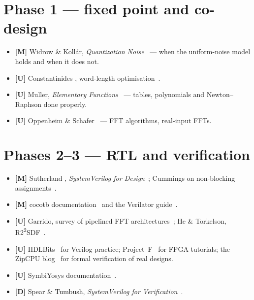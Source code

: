 \section*{Phase 1 --- fixed point and co-design}
\begin{itemize}
  \item \textbf{[M]} Widrow \& Koll\'ar, \emph{Quantization
        Noise}~\cite{widrow2008quantization} --- when the uniform-noise model
        holds and when it does not.
  \item \textbf{[U]} Constantinides \etal, word-length
        optimisation~\cite{ch12-13:constantinides2003wordlength}.
  \item \textbf{[U]} Muller, \emph{Elementary Functions}~\cite{muller2016elementary}
        --- tables, polynomials and Newton--Raphson done properly.
  \item \textbf{[U]} Oppenheim \& Schafer~\cite{oppenheim2010dtsp} --- FFT
        algorithms, real-input FFTs.
\end{itemize}

\section*{Phases 2--3 --- RTL and verification}
\begin{itemize}
  \item \textbf{[M]} Sutherland \etal, \emph{SystemVerilog for
        Design}~\cite{sutherland2006svdesign}; Cummings on non-blocking
        assignments~\cite{cummings2000nonblocking}.
  \item \textbf{[M]} cocotb documentation~\cite{ch12-13:cocotbdocs} and the
        Verilator guide~\cite{ch12-13:verilatorguide}.
  \item \textbf{[U]} Garrido, survey of pipelined FFT
        architectures~\cite{ch12-13:garrido2022fft}; He \& Torkelson,
        R2\textsuperscript{2}SDF~\cite{he1996r22sdf}.
  \item \textbf{[U]} HDLBits~\cite{ch12-13:hdlbits} for Verilog practice;
        Project~F~\cite{ch12-13:projectf} for FPGA tutorials; the ZipCPU
        blog~\cite{ch12-13:zipcpu} for formal verification of real designs.
  \item \textbf{[U]} SymbiYosys documentation~\cite{ch12-13:sbydocs}.
  \item \textbf{[D]} Spear \& Tumbush, \emph{SystemVerilog for
        Verification}~\cite{ch12-13:spear2012svverif}.
\end{itemize}

